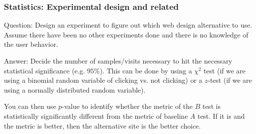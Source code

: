 \documentclass[11pt]{beamer}
\begin{document}
\begin{frame}
\frametitle{Statistics: Experimental design and related}
\begin{block}{Question:}
	Design an experiment to figure out which web design alternative to use. Assume there have been no other experiments done and there is no knowledge of the user behavior.
\end{block}
\begin{block}{Answer:}
	Decide the number of samples/visits necessary to hit the necessary statistical significance (e.g. $95\%$). This can be done by using a $\chi^2$ test (if we are using a binomial random variable of clicking vs. not clicking) or a $z$-­test (if we are using a normally distributed random variable). 
	
	You can then use $p$­-value to identify whether the metric of the $B$ test is statistically significantly different from the metric of  baseline $A$ test. If it is and the metric is better, then the alternative site is the better choice.
\end{block}
\end{frame}
\end{document}
